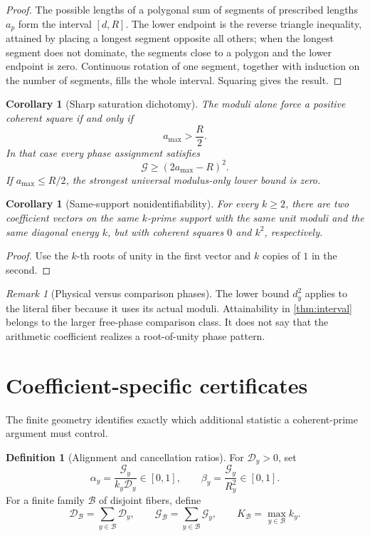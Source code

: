 \documentclass[11pt,a4paper]{article}
\newtheorem{corollary}[theorem]{Corollary}
\theoremstyle{definition}
\newtheorem{definition}[theorem]{Definition}
\theoremstyle{remark}
\newtheorem{remark}[theorem]{Remark}
\newcommand{\cD}{\mathcal D}
\newcommand{\cG}{\mathcal G}
\newcommand{\cB}{\mathcal B}
\begin{document}
\begin{proof}
The possible lengths of a polygonal sum of segments of prescribed
lengths \(a_p\) form the interval
\([d,R]\).  The lower endpoint is the reverse triangle inequality,
attained by placing a longest segment opposite all others; when the
longest segment does not dominate, the segments close to a polygon
and the lower endpoint is zero.  Continuous rotation of one segment,
together with induction on the number of segments, fills the whole
interval.  Squaring gives the result.
\end{proof}

\begin{corollary}[Sharp saturation dichotomy]
\label{cor:dichotomy}
The moduli alone force a positive coherent square if and only if
\[
 a_{\max}>\frac{R}{2}.
\]
In that case every phase assignment satisfies
\[
 \cG\ge(2a_{\max}-R)^2.
\]
If \(a_{\max}\le R/2\), the strongest universal modulus-only lower
bound is zero.
\end{corollary}

\begin{corollary}[Same-support nonidentifiability]
\label{cor:roots}
For every \(k\ge2\), there are two coefficient vectors on the same
\(k\)-prime support with the same unit moduli and the same diagonal
energy \(k\), but with coherent squares \(0\) and \(k^2\),
respectively.
\end{corollary}

\begin{proof}
Use the \(k\)-th roots of unity in the first vector and \(k\) copies
of \(1\) in the second.
\end{proof}

\begin{remark}[Physical versus comparison phases]
The lower bound \(d_y^2\) applies to the literal fiber because it uses
its actual moduli.  Attainability in \cref{thm:interval} belongs to
the larger free-phase comparison class.  It does not say that the
arithmetic coefficient realizes a root-of-unity phase pattern.
\end{remark}

\section{Coefficient-specific certificates}

The finite geometry identifies exactly which additional statistic a
coherent-prime argument must control.

\begin{definition}[Alignment and cancellation ratios]
For \(\cD_y>0\), set
\[
 \alpha_y=\frac{\cG_y}{k_y\cD_y}\in[0,1],
 \qquad
 \beta_y=\frac{\cG_y}{R_y^2}\in[0,1].
\]
For a finite family \(\cB\) of disjoint fibers, define
\[
 \cD_{\cB}=\sum_{y\in\cB}\cD_y,\qquad
 \cG_{\cB}=\sum_{y\in\cB}\cG_y,\qquad
 K_{\cB}=\max_{y\in\cB}k_y.
\]
\end{definition}
\end{document}
